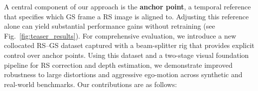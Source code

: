 A central component of our approach is the \textbf{anchor point}, a temporal reference that specifies which GS frame a RS image is aligned to.   Adjusting this reference alone can yield substantial performance gains without retraining (see Fig.~\ref{fig:teaser_results}). For comprehensive evaluation, we introduce a new collocated RS–GS dataset captured with a beam-splitter rig that provides explicit control over anchor points. Using this dataset and a two-stage visual foundation pipeline for RS correction and depth estimation, we demonstrate improved robustness to large distortions and aggressive ego-motion across synthetic and real-world benchmarks.
\vspace{1mm}
\noindent
{Our contributions are as follows:}
